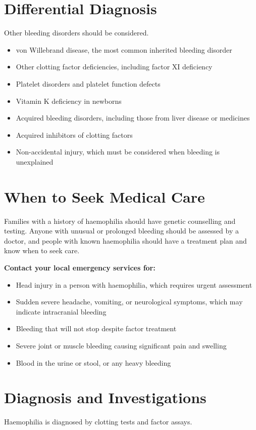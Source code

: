 \section*{Differential Diagnosis}
Other bleeding disorders should be considered.

\begin{itemize}
    \item von Willebrand disease, the most common inherited bleeding disorder
    \item Other clotting factor deficiencies, including factor XI deficiency
    \item Platelet disorders and platelet function defects
    \item Vitamin K deficiency in newborns
    \item Acquired bleeding disorders, including those from liver disease or medicines
    \item Acquired inhibitors of clotting factors
    \item Non-accidental injury, which must be considered when bleeding is unexplained
\end{itemize}

\section*{When to Seek Medical Care}
Families with a history of haemophilia should have genetic counselling and testing. Anyone with unusual or prolonged bleeding should be assessed by a doctor, and people with known haemophilia should have a treatment plan and know when to seek care.

\textbf{Contact your local emergency services for:}
\begin{itemize}
    \item Head injury in a person with haemophilia, which requires urgent assessment
    \item Sudden severe headache, vomiting, or neurological symptoms, which may indicate intracranial bleeding
    \item Bleeding that will not stop despite factor treatment
    \item Severe joint or muscle bleeding causing significant pain and swelling
    \item Blood in the urine or stool, or any heavy bleeding
\end{itemize}

\section*{Diagnosis and Investigations}
Haemophilia is diagnosed by clotting tests and factor assays.

